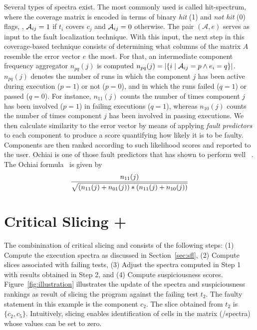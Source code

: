 \documentclass{article}
\begin{document}
Several types of spectra exist.  The most commonly used is called
hit-spectrum, where the coverage matrix is encoded in terms of binary
\emph{hit} (1) and \emph{not hit} (0) flags, \ie{}, $\mathcal{A}_{ij} = 1$ if
$t_i$ covers $c_j$ and $\mathcal{A}_{ij} = 0$ otherwise.  The pair
$(\mathcal{A},e)$ serves as input to the fault localization technique.
With this input, the next step in this coverage-based technique
consists of determining what columns of the matrix $A$ resemble the
error vector $e$ the most.  For that, an intermediate component
frequency aggregator $n_{pq}(j)$ is computed $n_{pq}(j) = |\{i\mid
\mathcal{A}_{ij}=p \wedge e_i=q\}|$. $n_{pq}(j)$ denotes the number of runs in
which the component $j$ has been active during execution ($p = 1$) or
not ($p=0$), and in which the runs failed ($q = 1$) or passed ($q =
0$).  For instance, $n_{11}(j)$ counts the number of times component
$j$ has been involved ($p = 1$) in failing executions ($q = 1$),
whereas $n_{10}(j)$ counts the number of times component $j$ has been
involved in passing executions. We then calculate similarity to the
error vector by means of applying \emph{fault predictors} to each
component to produce a score quantifying how likely it is to be
faulty.  Components are then ranked according to such likelihood
scores and reported to the user. Ochiai is one of those fault
predictors that has shown to perform well ~\cite{Pearson:2017:EIF:3097368.3097441,7390282}.
The Ochiai formula~\cite{DBLP:conf/prdc/AbreuZG06} is given by
\[\frac{n_{11}(j)}{\sqrt{(n_{11}(j)+n_{01}(j)) * (n_{11}(j)+n_{10}(j))}}\]

\section{Critical Slicing + \sfl{}}
\label{sec:combination}

The combinination of critical slicing and \sfl{} consists of the
following steps: (1) Compute the execution spectra as discussed in
Section~\ref{sec:sfl}, (2) Compute slices associated with failing
tests, (3) Adjust the spectra computed in Step 1 with results obtained
in Step 2, and (4) Compute suspiciousness
scores. Figure~\ref{fig:illustration} illustrates the update of the
spectra and suspiciousness rankings as result of slicing the program
against the failing test $t_2$. The faulty statement in this example
is the component $c_2$.  The slice obtained from $t_2$ is $\{c_2,
c_5\}$.  Intuitively, slicing enables identification of cells in the
matrix (/spectra) whose values can be set to zero.

\end{document}
